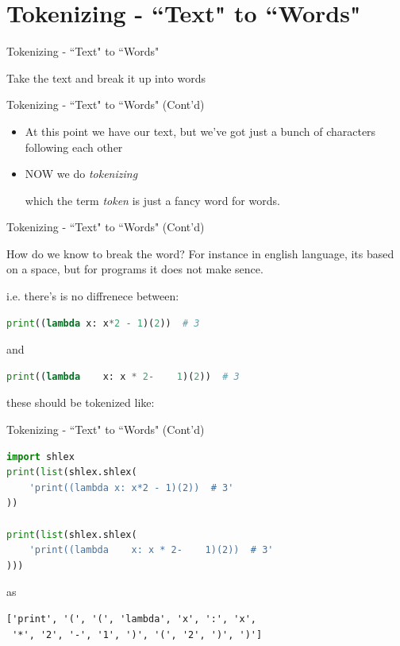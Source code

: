 \documentclass[aspectratio=169, dvipsnames, svgnames, x11names]{beamer}
\begin{document}
\section{Tokenizing - ``Text" to ``Words"}
\begin{frame}{Tokenizing - ``Text" to ``Words"}
\begin{itemize}
{\LARGE \item[-] Take the text and break it up into words}
\end{itemize}
\end{frame}

\begin{frame}{Tokenizing - ``Text" to ``Words" (Cont'd)}
\begin{itemize}
\item[-]<1>
At this point we have our text, but we’ve got just a bunch of characters following each other

\item[-]<2> NOW we do \textit{tokenizing}

which the term \textit{token} is just a fancy word for words.
\end{itemize}
\end{frame}

\begin{frame}[fragile]{Tokenizing - ``Text" to ``Words" (Cont'd)}
\begin{flushleft}
How do we know to break the word? For instance in english language, its based on a space, but for programs it
does not make sence. 

i.e. there's is no diffrenece between:
\begin{lstlisting}[language=python, keywordstyle=\color{Mulberry}\textbf]
print((lambda x: x*2 - 1)(2))  # 3
\end{lstlisting}
and
\begin{lstlisting}[language=python, keywordstyle=\color{Mulberry}\textbf]
print((lambda    x: x * 2-    1)(2))  # 3
\end{lstlisting}
these should be tokenized like:
\end{flushleft}
\end{frame}

\begin{frame}[fragile]{Tokenizing - ``Text" to ``Words" (Cont'd)}
\begin{flushleft}
\begin{lstlisting}[language=python, keywordstyle=\color{Mulberry}\textbf]
import shlex
print(list(shlex.shlex(
    'print((lambda x: x*2 - 1)(2))  # 3'
))

print(list(shlex.shlex(
    'print((lambda    x: x * 2-    1)(2))  # 3'
)))
\end{lstlisting}
as
\begin{lstlisting}
['print', '(', '(', 'lambda', 'x', ':', 'x',
 '*', '2', '-', '1', ')', '(', '2', ')', ')']
\end{lstlisting}
\end{flushleft}
\end{frame}
\end{document}
